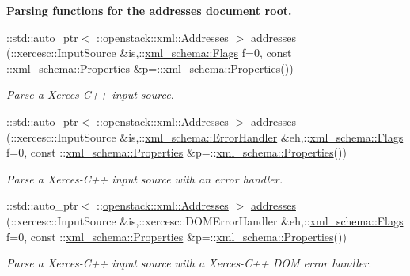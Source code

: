 \begin{Indent}{\bf Parsing functions for the addresses document root.}
\begin{DoxyCompactItemize}
::std::auto\_\-ptr$<$ ::\hyperlink{classopenstack_1_1xml_1_1Addresses}{openstack::xml::Addresses} $>$ \hyperlink{namespaceopenstack_1_1xml_abeda057f80dd9303b4f63e0a72a5a461}{addresses} (::xercesc::InputSource \&is,::\hyperlink{namespacexml__schema_affb4c227cbd9aa7453dd1dc5a1401943}{xml\_\-schema::Flags} f=0, const ::\hyperlink{namespacexml__schema_ad27ce19a7ee1d3b1064092648898f64c}{xml\_\-schema::Properties} \&p=::\hyperlink{namespacexml__schema_ad27ce19a7ee1d3b1064092648898f64c}{xml\_\-schema::Properties}())
\begin{DoxyCompactList}\small\item\em Parse a Xerces-\/C++ input source. \item\end{DoxyCompactList}\item 
::std::auto\_\-ptr$<$ ::\hyperlink{classopenstack_1_1xml_1_1Addresses}{openstack::xml::Addresses} $>$ \hyperlink{namespaceopenstack_1_1xml_a9eabb5ec190197f0a06507c76379c6cc}{addresses} (::xercesc::InputSource \&is,::\hyperlink{namespacexml__schema_ab1c9361bfd3b404eaabf0c31eded79dc}{xml\_\-schema::ErrorHandler} \&eh,::\hyperlink{namespacexml__schema_affb4c227cbd9aa7453dd1dc5a1401943}{xml\_\-schema::Flags} f=0, const ::\hyperlink{namespacexml__schema_ad27ce19a7ee1d3b1064092648898f64c}{xml\_\-schema::Properties} \&p=::\hyperlink{namespacexml__schema_ad27ce19a7ee1d3b1064092648898f64c}{xml\_\-schema::Properties}())
\begin{DoxyCompactList}\small\item\em Parse a Xerces-\/C++ input source with an error handler. \item\end{DoxyCompactList}\item 
::std::auto\_\-ptr$<$ ::\hyperlink{classopenstack_1_1xml_1_1Addresses}{openstack::xml::Addresses} $>$ \hyperlink{namespaceopenstack_1_1xml_a51396eb916f73c9b612c5ca70f9fff3e}{addresses} (::xercesc::InputSource \&is,::xercesc::DOMErrorHandler \&eh,::\hyperlink{namespacexml__schema_affb4c227cbd9aa7453dd1dc5a1401943}{xml\_\-schema::Flags} f=0, const ::\hyperlink{namespacexml__schema_ad27ce19a7ee1d3b1064092648898f64c}{xml\_\-schema::Properties} \&p=::\hyperlink{namespacexml__schema_ad27ce19a7ee1d3b1064092648898f64c}{xml\_\-schema::Properties}())
\begin{DoxyCompactList}\small\item\em Parse a Xerces-\/C++ input source with a Xerces-\/C++ DOM error handler. \item\end{DoxyCompactList}\item 

\end{DoxyCompactItemize}
\end{Indent}
